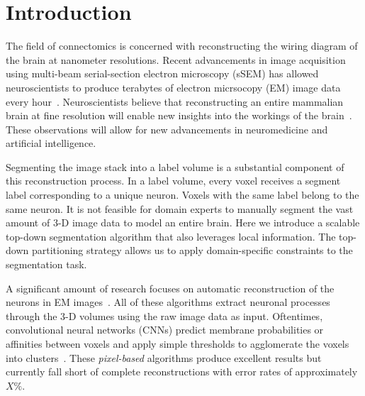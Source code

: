 \section{Introduction}

The field of connectomics is concerned with reconstructing the wiring diagram of the brain at nanometer resolutions. 
Recent advancements in image acquisition using multi-beam serial-section electron microscopy (sSEM) has allowed neuroscientists to produce terabytes of electron micrsocopy (EM) image data every hour~\cite{hildebrand2017whole}.
Neuroscientists believe that reconstructing an entire mammalian brain at fine resolution will enable new insights into the workings of the brain~\cite{kasthuri2015saturated}. 
These observations will allow for new advancements in neuromedicine and artificial intelligence. 

Segmenting the image stack into a label volume is a substantial component of this reconstruction process.
In a label volume, every voxel receives a segment label corresponding to a unique neuron. 
Voxels with the same label belong to the same neuron.
It is not feasible for domain experts to manually segment the vast amount of 3-D image data to model an entire brain.
Here we introduce a scalable top-down segmentation algorithm that also leverages local information.
The top-down partitioning strategy allows us to apply domain-specific constraints to the segmentation task.

A significant amount of research focuses on automatic reconstruction of the neurons in EM images~\cite{seymour2016rhoananet,nunez2014graph,parag2017anisotropic,zlateski2015image}. %
All of these algorithms extract neuronal processes through the 3-D volumes using the raw image data as input.
Oftentimes, convolutional neural networks (CNNs) predict membrane probabilities or affinities between voxels and apply simple thresholds to agglomerate the voxels into clusters~\cite{lee2015recursive,ronneberger2015u}.
These \textit{pixel-based} algorithms produce excellent results but currently fall short of complete reconstructions with error rates of approximately $X\%$. %
 
